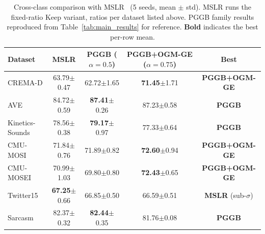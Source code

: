 \documentclass{article}
\begin{document}
\begin{table}[H]
\centering
\caption{Cross-class comparison with MSLR~\citep{yao2022mslr} (5 seeds, mean $\pm$ std). MSLR runs the fixed-ratio Keep variant, ratios per dataset listed above. PGGB family results reproduced from Table~\ref{tab:main_results} for reference. \textbf{Bold} indicates the best per-row mean.}
\label{tab:mslr_comparison}
\vspace{0.3em}
\footnotesize
\begin{tabular}{lcccc}
\toprule
\textbf{Dataset} & MSLR & PGGB ($\alpha{=}0.5$) & PGGB+OGM-GE ($\alpha{=}0.75$) & Best \\
\midrule
CREMA-D    & 63.79{\scriptsize$\pm$0.47} & 62.72{\scriptsize$\pm$1.65} & \textbf{71.45}{\scriptsize$\pm$1.71} & \textbf{PGGB+OGM-GE} \\
AVE        & 84.72{\scriptsize$\pm$0.59} & \textbf{87.41}{\scriptsize$\pm$0.26} & 87.23{\scriptsize$\pm$0.58} & \textbf{PGGB} \\
Kinetics-Sounds & 78.56{\scriptsize$\pm$0.38} & \textbf{79.17}{\scriptsize$\pm$0.97} & 77.33{\scriptsize$\pm$0.64} & \textbf{PGGB} \\
CMU-MOSI   & 71.84{\scriptsize$\pm$0.76} & 71.89{\scriptsize$\pm$0.82} & \textbf{72.60}{\scriptsize$\pm$0.94} & \textbf{PGGB+OGM-GE} \\
CMU-MOSEI  & 70.99{\scriptsize$\pm$1.03} & 69.80{\scriptsize$\pm$0.80} & \textbf{72.43}{\scriptsize$\pm$0.65} & \textbf{PGGB+OGM-GE} \\
Twitter15  & \textbf{67.25}{\scriptsize$\pm$0.66} & 66.85{\scriptsize$\pm$0.50} & 66.59{\scriptsize$\pm$0.51} & \textbf{MSLR} (sub-$\sigma$) \\
Sarcasm    & 82.37{\scriptsize$\pm$0.32} & \textbf{82.44}{\scriptsize$\pm$0.35} & 81.76{\scriptsize$\pm$0.08} & \textbf{PGGB} \\
\bottomrule
\end{tabular}
\end{table}


\newpage

\end{document}
